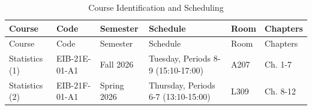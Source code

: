 \documentclass[
]{article}
\begin{document}
\begin{longtable}[]{@{}
  >{\raggedright\arraybackslash}p{}
  >{\raggedright\arraybackslash}p{}
  >{\raggedright\arraybackslash}p{}
  >{\raggedright\arraybackslash}p{}
  >{\raggedright\arraybackslash}p{}
  >{\raggedright\arraybackslash}p{}@{}}
\caption{Course Identification and Scheduling}\tabularnewline
\toprule\noalign{}
\begin{minipage}[b]{\linewidth}\raggedright
Course
\end{minipage} & \begin{minipage}[b]{\linewidth}\raggedright
Code
\end{minipage} & \begin{minipage}[b]{\linewidth}\raggedright
Semester
\end{minipage} & \begin{minipage}[b]{\linewidth}\raggedright
Schedule
\end{minipage} & \begin{minipage}[b]{\linewidth}\raggedright
Room
\end{minipage} & \begin{minipage}[b]{\linewidth}\raggedright
Chapters
\end{minipage} \\
\midrule\noalign{}
\endfirsthead
\toprule\noalign{}
\begin{minipage}[b]{\linewidth}\raggedright
Course
\end{minipage} & \begin{minipage}[b]{\linewidth}\raggedright
Code
\end{minipage} & \begin{minipage}[b]{\linewidth}\raggedright
Semester
\end{minipage} & \begin{minipage}[b]{\linewidth}\raggedright
Schedule
\end{minipage} & \begin{minipage}[b]{\linewidth}\raggedright
Room
\end{minipage} & \begin{minipage}[b]{\linewidth}\raggedright
Chapters
\end{minipage} \\
\midrule\noalign{}
\endhead
\bottomrule\noalign{}
\endlastfoot
Statistics (1) & EIB-21E-01-A1 & Fall 2026 & Tuesday, Periods 8-9
(15:10-17:00) & A207 & Ch. 1-7 \\
Statistics (2) & EIB-21F-01-A1 & Spring 2026 & Thursday, Periods 6-7
(13:10-15:00) & L309 & Ch. 8-12 \\
\end{longtable}
\end{document}
